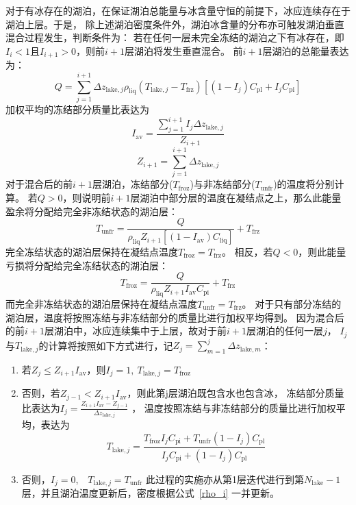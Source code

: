 对于有冰存在的湖泊，在保证湖泊总能量与冰含量守恒的前提下，冰应连续存在于湖泊上层。于是，
除上述湖泊密度条件外，湖泊冰含量的分布亦可触发湖泊垂直混合过程发生，判断条件为：
若在任何一层未完全冻结的湖泊之下有冰存在，即$I_i<1$且$I_{i+1}>0$，则前$i+1$层湖泊将发生垂直混合。
前$i+1$层湖泊的总能量表达为：
\begin{equation}
  Q=\sum_{j=1}^{i+1} \Delta z_{\mathrm{lake},j} \rho_{\mathrm{liq}}\left(T_{\mathrm{lake},j}-T_{\mathrm {frz}}\right)\left[\left(1-I_{j}\right) C_{\mathrm{p l}}+I_{j} C_{\mathrm{p i}}\right]
\end{equation}
加权平均的冻结部分质量比表达为
\begin{equation}
  I_{\mathrm{a v}}=\frac{\sum_{j=1}^{i+1} I_{j} \Delta z_{\mathrm{lake},j}}{Z_{i+1}}
\end{equation}
\begin{equation}
  Z_{i+1}=\sum_{j=1}^{i+1} \Delta z_{\mathrm{lake},j}
\end{equation}
对于混合后的前$i+1$层湖泊，冻结部分($T_{\mathrm{froz}}$)与非冻结部分($T_{\mathrm{unfr}}$)的温度将分别计算。
若$Q>0$，则说明前$i+1$层湖泊中部分层的温度在凝结点之上，那么此能量盈余将分配给完全非冻结状态的湖泊层：
\begin{equation}
  T_{\mathrm{unfr}}=\frac{Q}{\rho_{\mathrm{liq}} Z_{i+1}\left[\left(1-I_{\mathrm{av}}\right) C_{\mathrm{liq}}\right]}+T_{\mathrm {frz}}
\end{equation}
完全冻结状态的湖泊层保持在凝结点温度$T_{\mathrm{froz}}=T_{\mathrm {frz}} $。
相反，若$Q<0$，则此能量亏损将分配给完全冻结状态的湖泊层：
\begin{equation}
  T_{\mathrm{froz}}=\frac{Q}{\rho_{\mathrm{liq}} Z_{i+1} I_{\mathrm{a v}} C_{\mathrm{p i}}}+T_{\mathrm {frz}}
\end{equation}
而完全非冻结状态的湖泊层保持在凝结点温度$T_{\mathrm{unfr}}=T_{\mathrm {frz}} $。
对于只有部分冻结的湖泊层，温度将按照冻结与非冻结部分的质量比进行加权平均得到。
因为混合后的前$i+1$层湖泊中，冰应连续集中于上层，故对于前$i+1$层湖泊的任何一层$j$，
$I_j$与$T_{\mathrm{lake},j}$的计算将按照如下方式进行，记${Z_j}=\sum_{m=1}^{j} \Delta z_{\mathrm{lake},m} $：\\
\begin{enumerate}
  \item 若$Z_j\leqslant Z_{i+1}I_{\mathrm{av}}$，则$I_j=1,\ T_{\mathrm{lake},j}=T_{\mathrm{froz}}$
  \item 否则，若$Z_{j-1}<Z_{i+1} I_{\mathrm{a v}}$，则此第j层湖泊既包含水也包含冰，
    冻结部分质量比表达为$I_{j}=\frac{Z_{i+1} I_{\mathrm{a v}}-Z_{j-1}}{\Delta z_{\mathrm{lake},j}}$ ，
    温度按照冻结与非冻结部分的质量比进行加权平均，表达为
    \begin{equation}
      T_{\mathrm{lake},j}=\frac{T_{\mathrm{f r o z}} I_{j} C_{\mathrm{p i}}+T_{\mathrm{u n f r}}\left(1-I_{j}\right) C_{\mathrm{p l}}}{I_{j} C_{\mathrm{p i}}+\left(1-I_{j}\right) C_{\mathrm{p l}}}
    \end{equation}
  \item 否则，$I_j=0$,\ \ $T_{\mathrm{lake},j}=T_{\mathrm{unfr}}$
    此过程的实施亦从第1层迭代进行到第$N_{\mathrm{lake}}-1$层，并且湖泊温度更新后，密度根据公式~\eqref{rho_i} 一并更新。
\end{enumerate}


